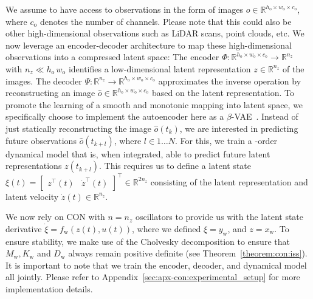 We assume to have access to observations in the form of images $o \in \mathbb{R}^{h_\mathrm{o} \times w_\mathrm{o} \times c_\mathrm{o}}$, where $c_\mathrm{o}$ denotes the number of channels. Please note that this could also be other high-dimensional observations such as LiDAR scans, point clouds, etc.
We now leverage an encoder-decoder architecture to map these high-dimensional observations into a compressed latent space: %
The encoder $\Phi: \mathbb{R}^{h_\mathrm{o} \times w_\mathrm{o} \times c_\mathrm{o}} \to \mathbb{R}^{n_z} $ with $n_z \ll h_\mathrm{o} \,  w_\mathrm{o}$ identifies a low-dimensional latent representation $z \in \mathbb{R}^{n_z}$ of the images. The decoder $\Psi: \mathbb{R}^{n_z} \to \mathbb{R}^{h_\mathrm{o} \times w_\mathrm{o} \times c_\mathrm{o}}$ approximates the inverse operation by reconstructing an image $\hat{o} \in \mathbb{R}^{h_\mathrm{o} \times w_\mathrm{o} \times c_\mathrm{o}}$ based on the latent representation.
To promote the learning of a smooth and monotonic mapping into latent space, we specifically choose to implement the autoencoder here as a $\beta$-\gls{VAE}~\citep{kingma2014auto, higgins2017beta}.
Instead of just statically reconstructing the image $\hat{o}(t_k)$, we are interested in predicting future observations $\hat{o}(t_{k+l})$, where $l \in 1 \dots N$. For this, we train a -order dynamical model that is, when integrated, able to predict future latent representations $z(t_{k+l})$.
This requires us to define a latent state $\xi(t) = \begin{bmatrix}
    z^\top(t) & \dot{z}^\top(t)
\end{bmatrix}^\top \in \mathbb{R}^{2n_z}$ consisting of the latent representation and latent velocity $\dot{z}(t) \in \mathbb{R}^{n_z}$.

We now rely on \gls{CON} with $n = n_z$ oscillators to provide us with the latent state derivative $\dot{\xi}= f_\mathrm{w}(z(t), u(t))$, where we defined $\xi = y_\mathrm{w}$, and $z = x_\mathrm{w}$. To ensure stability, we make use of the Cholvesky decomposition to ensure that $M_\mathrm{w}, K_\mathrm{w}$ and $D_\mathrm{w}$ always remain positive definite (see Theorem~\ref{theorem:con:iss}).
It is important to note that we train the encoder, decoder, and dynamical model all jointly.
Please refer to Appendix~\ref{sec:apx-con:experimental_setup} for more implementation details.

